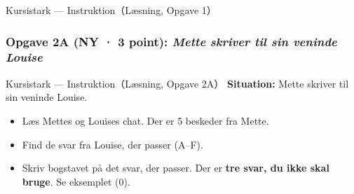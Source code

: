 \begin{emailbox}{Kursistark --- Instruktion（Læsning, Opgave 1）}
\vspace{0.55em}
\begin{center}
\end{center}
\end{emailbox}

\subsubsection*{Opgave 2A (NY · 3 point): \textit{Mette skriver til sin veninde Louise}}

\begin{emailbox}{Kursistark --- Instruktion（Læsning, Opgave 2A）}
\textbf{Situation:} Mette skriver til sin veninde Louise.
\begin{itemize}
  \item Læs Mettes og Louises chat. Der er 5 beskeder fra Mette.
  \item Find de svar fra Louise, der passer (A--F).
  \item Skriv bogstavet på det svar, der passer. Der er \textbf{tre svar, du ikke skal bruge}. Se eksemplet (0).
\end{itemize}
\end{emailbox}

